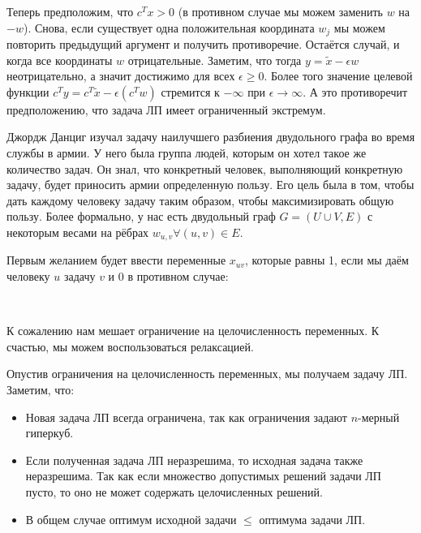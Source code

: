 {Теперь предположим, что $c^T x > 0$ (в противном случае мы можем заменить $w$ на $-w$). Снова, если существует одна положительная координата $w_j$ мы можем повторить предыдущий аргумент и получить противоречие. Остаётся случай, и когда все координаты $w$ отрицательные. Заметим, что тогда $y = \tilde{x} - \epsilon w$ неотрицательно, а значит достижимо для всех $\epsilon \geq 0$. Более того значение целевой функции $c^T y = c^T \tilde{x} - \epsilon(c^T w)$ стремится к $-\infty$ при $\epsilon \rightarrow \infty$. А это противоречит предположению, что задача ЛП имеет ограниченный экстремум.
}
\



Джордж Данциг изучал задачу наилучшего разбиения двудольного графа во время службы в армии. У него была группа людей, которым он хотел такое же количество задач. Он знал, что конкретный человек, выполняющий конкретную задачу, будет приносить армии определенную пользу. Его цель была в том, чтобы дать каждому человеку задачу таким образом, чтобы максимизировать общую пользу. Более формально, у нас есть двудольный граф $G = (U \cup V, E)$ с некоторым весами на рёбрах $w_{u, v} \forall (u, v) \in E$.

Первым желанием будет ввести переменные $x_{uv}$, которые равны 1, если мы даём человеку $u$ задачу $v$ и 0 в противном случае:

\

К сожалению нам мешает ограничение на целочисленность переменных. К счастью, мы можем воспользоваться релаксацией.


Опустив ограничения на целочисленность переменных, мы получаем задачу ЛП. Заметим, что:

\begin{itemize}
  \item Новая задача ЛП всегда ограничена, так как ограничения задают $n$-мерный гиперкуб.
  \item Если полученная задача ЛП неразрешима, то исходная задача также неразрешима. Так как если множество допустимых решений задачи ЛП пусто, то оно не может содержать целочисленных решений.
  \item В общем случае оптимум исходной задачи $\leq$ оптимума задачи ЛП. 
\end{itemize}
\

